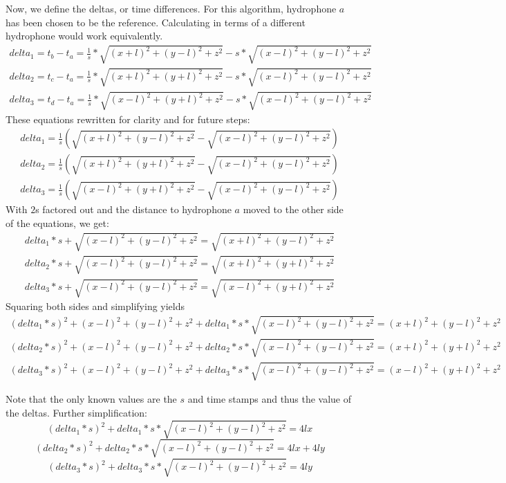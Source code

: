 \documentclass{article}
\begin{document}
Now, we define the deltas, or time differences. For this algorithm, hydrophone $a$ has been chosen to be the reference. Calculating in terms of a different hydrophone would work equivalently. 
\begin{gather*}
    delta_1 = t_b-t_a = \frac{1}{s}*\sqrt{(x+l)^2+(y-l)^2+z^2} - s*\sqrt{(x-l)^2+(y-l)^2+z^2}\\
    delta_2 = t_c-t_a = \frac{1}{s}*\sqrt{(x+l)^2+(y+l)^2+z^2} - s*\sqrt{(x-l)^2+(y-l)^2+z^2}\\
    delta_3 = t_d-t_a = \frac{1}{s}*\sqrt{(x-l)^2+(y+l)^2+z^2} - s*\sqrt{(x-l)^2+(y-l)^2+z^2}
\end{gather*}
These equations rewritten for clarity and for future steps:
\begin{gather*}
    delta_1 = \frac{1}{s}(\sqrt{(x+l)^2+(y-l)^2+z^2} - \sqrt{(x-l)^2+(y-l)^2+z^2})\\
    delta_2 = \frac{1}{s}(\sqrt{(x+l)^2+(y+l)^2+z^2} - \sqrt{(x-l)^2+(y-l)^2+z^2})\\
    delta_3 = \frac{1}{s}(\sqrt{(x-l)^2+(y+l)^2+z^2} - \sqrt{(x-l)^2+(y-l)^2+z^2})
\end{gather*}
With $2$s factored out and the distance to hydrophone $a$ moved to the other side of the equations, we get:
\begin{gather*}
    delta_1*s +\sqrt{(x-l)^2+(y-l)^2+z^2} = \sqrt{(x+l)^2+(y-l)^2+z^2}\\
    delta_2*s + \sqrt{(x-l)^2+(y-l)^2+z^2} = \sqrt{(x+l)^2+(y+l)^2+z^2}\\
    delta_3*s + \sqrt{(x-l)^2+(y-l)^2+z^2} = \sqrt{(x-l)^2+(y+l)^2+z^2}
\end{gather*}
Squaring both sides and simplifying yields
\begin{gather*}
    (delta_1*s)^2 +(x-l)^2+(y-l)^2+z^2 + delta_1*s*\sqrt{(x-l)^2+(y-l)^2+z^2}= (x+l)^2+(y-l)^2+z^2\\
    (delta_2*s)^2 + (x-l)^2+(y-l)^2+z^2 + delta_2*s*\sqrt{(x-l)^2+(y-l)^2+z^2} = (x+l)^2+(y+l)^2+z^2\\
    (delta_3*s)^2 + (x-l)^2+(y-l)^2+z^2 + delta_3*s*\sqrt{(x-l)^2+(y-l)^2+z^2} = (x-l)^2+(y+l)^2+z^2
\end{gather*}

Note that the only known values are the $s$ and time stamps and thus the value of the deltas. Further simplification: 
\begin{equation}
\label{equ:d1}
    (delta_1*s)^2  + delta_1*s*\sqrt{(x-l)^2+(y-l)^2+z^2}= 4lx
\end{equation}
\begin{equation}
\label{equ:d2}
     (delta_2*s)^2 + delta_2*s*\sqrt{(x-l)^2+(y-l)^2+z^2} = 4lx+4ly
\end{equation}
\begin{equation}
\label{equ:d3}
     (delta_3*s)^2 + delta_3*s*\sqrt{(x-l)^2+(y-l)^2+z^2} = 4ly
\end{equation}
\end{document}
